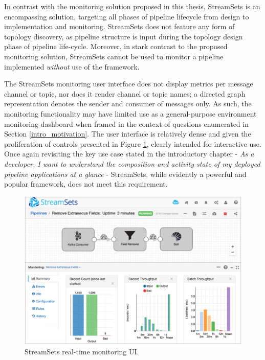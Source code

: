 In contrast with the monitoring solution proposed in this thesis, StreamSets is an encompassing solution, targeting all phases of pipeline lifecycle from design to implementation and monitoring. StreamSets does not feature any form of topology discovery, as pipeline structure is input during the topology design phase of pipeline life-cycle. Moreover, in stark contrast to the proposed monitoring solution, StreamSets cannot be used to monitor a pipeline implemented \textit{without} use of the framework. 

The StreamSets monitoring user interface does not display metrics per message channel or topic, nor does it render channel or topic names; a directed graph representation denotes the sender and consumer of messages only. As such, the monitoring functionality may have limited use as a general-purpose environment monitoring dashboard when framed in the context of questions enumerated in Section \ref{intro_motivation}. The user interface is relatively dense and given the proliferation of controls presented in Figure \ref{streamsets_monitor_ui}, clearly intended for interactive use. Once again revisiting the key use case stated in the introductory chapter - \textit {As a developer, I want to understand the composition and activity state of my deployed pipeline applications at a glance} - StreamSets, while evidently a powerful and popular framework\cite{StreamSe68:online}, does not meet this requirement.

\vspace{5mm}
 
\begin{figure}[H]
	\centering  
	\includegraphics[scale=1.4]{figures/background/streamsets_monitor_ui.png}
	\caption{StreamSets real-time monitoring UI.}
	\label{streamsets_monitor_ui}
\end{figure}

